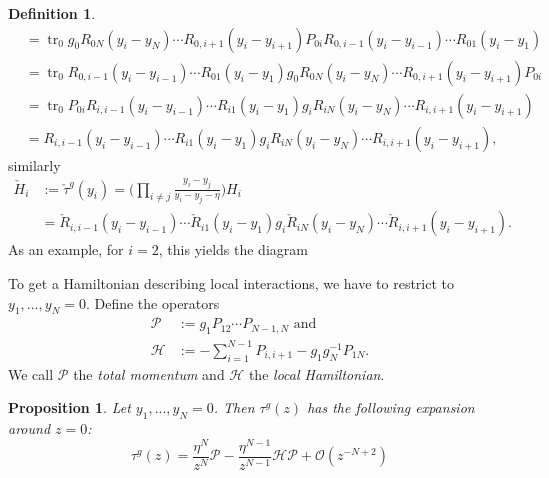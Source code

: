 \documentclass[11pt]{report}
\newtheorem{prop}[theorem]{Proposition}
\theoremstyle{definition}
\newtheorem{definition}[theorem]{Definition}
\theoremstyle{remark}
\theoremstyle{remark}
\begin{document}
\begin{definition}
\begin{align*}
&= \operatorname{tr}_0 g_0 R_{0N}(y_i-y_N) \cdots R_{0,i+1}(y_i-y_{i+1}) P_{0i} R_{0,i-1}(y_i-y_{i-1}) \cdots R_{01}(y_i-y_1) \\
&= \operatorname{tr}_0 R_{0,i-1}(y_i-y_{i-1}) \cdots R_{01}(y_i-y_1) g_0 R_{0N}(y_i-y_N) \cdots R_{0,i+1}(y_i-y_{i+1}) P_{0i} \\
&= \operatorname{tr}_0 P_{0i} R_{i,i-1}(y_i-y_{i-1}) \cdots R_{i1}(y_i-y_1) g_i R_{iN}(y_i-y_N) \cdots R_{i,i+1}(y_i-y_{i+1}) \\
&= R_{i,i-1}(y_i-y_{i-1}) \cdots R_{i1}(y_i-y_1) g_i R_{iN}(y_i-y_N) \cdots R_{i,i+1}(y_i-y_{i+1}),
\end{align*}
similarly
\begin{align*}
\check H_i
&:= \check \tau^g(y_i) = \bigg( \prod_{i \neq j} \frac{y_i-y_j}{y_i-y_j-\eta} \bigg) H_i \\
&= \check R_{i,i-1}(y_i-y_{i-1}) \cdots \check R_{i1}(y_i-y_1) g_i \check R_{iN}(y_i-y_N) \cdots \check R_{i,i+1}(y_i-y_{i+1}).
\end{align*}
As an example, for $i=2$, this yields the diagram
~\\
\begin{center}
\end{center}
To get a Hamiltonian describing local interactions, we have to restrict to $y_1,...,y_N = 0$. Define the operators
\begin{align*}
\mathcal{P} &:= g_1 P_{12} \cdots P_{N-1,N} \text{ and} \\
\mathcal{H} &:= -\sum_{i=1}^{N-1} P_{i,i+1} - g_1 g_N^{-1} P_{1N}.
\end{align*}
We call $\mathcal{P}$ the \emph{total momentum} and $\mathcal{H}$ the \emph{local Hamiltonian}.
\end{definition}

\begin{prop}
Let $y_1,...,y_N = 0$. Then $\tau^g(z)$ has the following expansion around $z=0$:
\begin{equation*}
\tau^g(z) = \frac{\eta^N}{z^N} \mathcal{P} - \frac{\eta^{N-1}}{z^{N-1}} \mathcal{H} \mathcal{P} + \mathcal{O}(z^{-N+2})
\end{equation*}
\end{prop}
\end{document}
